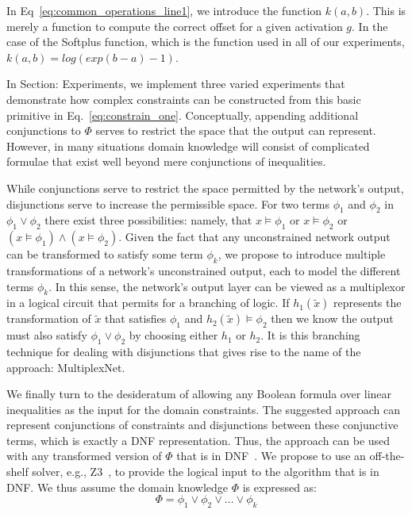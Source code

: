 \documentclass[letterpaper]{article} %
\begin{document}
In Eq~\ref{eq:common_operations_line1}, we introduce the function $k(a, b)$. 
This is merely a function to compute the correct offset for a given activation $g$.
In the case of the Softplus function, which is the function used in all of our experiments, $k(a,b) = log(exp(b-a) -1)$.

In Section: Experiments, we implement three varied experiments that demonstrate how complex constraints can be constructed from this basic primitive in Eq.~\ref{eq:constrain_one}.
Conceptually, appending additional conjunctions to $\Phi$ serves to restrict the space that the output can represent.
However, in many situations domain knowledge will consist of complicated formulae that exist well beyond mere conjunctions of inequalities.

While conjunctions serve to restrict the space permitted by the network's output, disjunctions serve to increase the permissible space. 
For two terms $\phi_1$ and $\phi_2$ in $\phi_1 \lor \phi_2$ there exist three possibilities: namely, 
that $x \models \phi_1$ or $x \models \phi_2$ or $(x \models \phi_1) \land (x \models \phi_2)$.
Given the fact that any unconstrained network output can be transformed to satisfy some term $\phi_k$, we propose to introduce multiple transformations of a network's unconstrained output, each to model the different terms $\phi_k$.
In this sense, the network's output layer can be viewed as a multiplexor in a logical circuit that permits for a branching of logic.
If $h_1(\tilde{x})$ represents the transformation of $\tilde{x}$ that satisfies $\phi_1$ and $h_2(\tilde{x}) \models \phi_2$ then we know the output must also satisfy $\phi_1 \lor \phi_2$ by choosing either $h_1$ or $h_2$.
It is this branching technique for dealing with disjunctions that gives rise to the name of the approach: MultiplexNet.

We finally turn to the desideratum of allowing any Boolean formula over linear inequalities as the input for the domain constraints.
The suggested approach can represent conjunctions of constraints and disjunctions between these conjunctive terms, which is exactly a DNF representation.
Thus, the approach can be used with any transformed version of $\Phi$ that is in DNF~\citep{darwiche2002knowledge}.
We propose to use an off-the-shelf solver, e.g., Z3~\citep{de2008z3}, to provide the logical input to the algorithm that is in DNF.
We thus assume the domain knowledge $\Phi$ is expressed as:
\begin{equation}
    \label{eq:dnf_representation}
    \Phi = \phi_1 \lor \phi_2 \lor \hdots \lor \phi_k
\end{equation}
\end{document}

